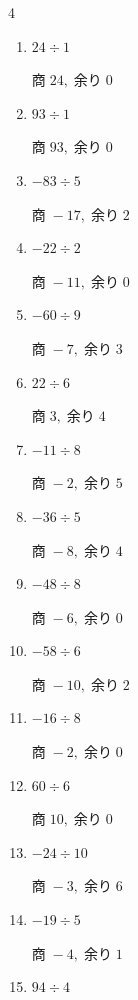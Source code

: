 \begin{multicols}{4}
\begin{enumerate}
        $商\; -8,\; 余り\; 2$

  \item $24 \div 1$

        $商\; 24,\; 余り\; 0$

  \item $93 \div 1$

        $商\; 93,\; 余り\; 0$

  \item $-83 \div 5$

        $商\; -17,\; 余り\; 2$

  \item $-22 \div 2$

        $商\; -11,\; 余り\; 0$

  \item $-60 \div 9$

        $商\; -7,\; 余り\; 3$

  \item $22 \div 6$

        $商\; 3,\; 余り\; 4$

  \item $-11 \div 8$

        $商\; -2,\; 余り\; 5$

  \item $-36 \div 5$

        $商\; -8,\; 余り\; 4$

  \item $-48 \div 8$

        $商\; -6,\; 余り\; 0$

  \item $-58 \div 6$

        $商\; -10,\; 余り\; 2$

\columnbreak %

  \item $-16 \div 8$

        $商\; -2,\; 余り\; 0$

  \item $60 \div 6$

        $商\; 10,\; 余り\; 0$

  \item $-24 \div 10$

        $商\; -3,\; 余り\; 6$

  \item $-19 \div 5$

        $商\; -4,\; 余り\; 1$

  \item $94 \div 4$


\end{enumerate}
\end{multicols}
